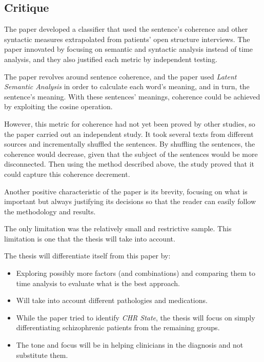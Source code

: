 \documentclass{Paper_Summary}
\begin{document}
\makepapertitle

\breakline

\begin{center}
    \section*{Critique}
\end{center}

    The paper developed a classifier that used the sentence's coherence and other syntactic measures extrapolated from patients' open structure interviews. The paper innovated by focusing on semantic and syntactic analysis instead of time analysis, and they also justified each metric by independent testing.

    The paper revolves around sentence coherence, and the paper used \emph{Latent Semantic Analysis} in order to calculate each word's meaning, and in turn, the sentence's meaning. With these sentences' meanings, coherence could be achieved by exploiting the cosine operation.

    However, this metric for coherence had not yet been proved by other studies, so the paper carried out an independent study. It took several texts from different sources and incrementally shuffled the sentences. By shuffling the sentences, the coherence would decrease, given that the subject of the sentences would be more disconnected. Then using the method described above, the study proved that it could capture this coherence decrement.

    Another positive characteristic of the paper is its brevity, focusing on what is important but always justifying its decisions so that the reader can easily follow the methodology and results.

    The only limitation was the relatively small and restrictive sample. This limitation is one that the thesis will take into account.

    The thesis will differentiate itself from this paper by:
    \begin{itemize}
        \item Exploring possibly more factors (and combinations) and comparing them to time analysis to evaluate what is the best approach.
        \item Will take into account different pathologies and medications.
        \item While the paper tried to identify \emph{CHR State}, the thesis will focus on simply differentiating schizophrenic patients from the remaining groups.
        \item The tone and focus will be in helping clinicians in the diagnosis and not substitute them.
    \end{itemize}

\breakline
\end{document}
